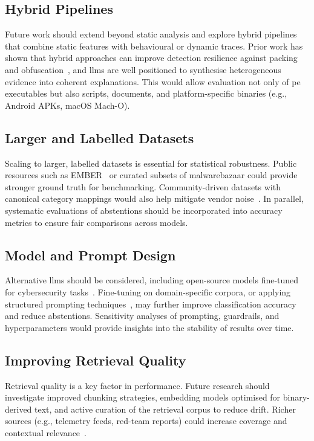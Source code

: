 \subsection{Hybrid Pipelines}\label{sec:HybridPipelines}
Future work should extend beyond static analysis and explore hybrid pipelines that combine static
features with behavioural or dynamic traces. Prior work has shown that hybrid approaches can
improve detection resilience against packing and obfuscation~\cite{fedak2020fundamentals}, and
\glspl{llm} are well positioned to synthesise heterogeneous evidence into coherent explanations.
This would allow evaluation not only of \gls{pe} executables but also scripts, documents, and
platform-specific binaries (e.g., Android APKs, macOS Mach-O).

\subsection{Larger and Labelled Datasets}\label{sec:LargerAndLabelledDatasets}
Scaling to larger, labelled datasets is essential for statistical robustness. Public resources such
as EMBER~\cite{anderson2018ember} or curated subsets of \gls{malwarebazaar} could provide stronger
ground truth for benchmarking. Community-driven datasets with canonical category mappings would
also help mitigate vendor noise~\cite{gaber2024malware}. In parallel, systematic evaluations of
abstentions should be incorporated into accuracy metrics to ensure fair comparisons across models.

\subsection{Model and Prompt Design}\label{sec:ModelAndPromptDesign}
Alternative \glspl{llm} should be considered, including open-source models fine-tuned for
cybersecurity tasks~\cite{metta2024generativeai, nourmohammadzadeh2024llmsurvey}. Fine-tuning on
domain-specific corpora, or applying structured prompting techniques~\cite{sahoo2024systematic},
may further improve classification accuracy and reduce abstentions. Sensitivity analyses of
prompting, guardrails, and hyperparameters would provide insights into the stability of results
over time.

\subsection{Improving Retrieval Quality}\label{sec:ImprovingRetrievalQuality}
Retrieval quality is a key factor in performance. Future research should investigate improved
chunking strategies, embedding models optimised for binary-derived text, and active curation of the
retrieval corpus to reduce drift. Richer sources (e.g., telemetry feeds, red-team reports) could
increase coverage and contextual relevance~\cite{gao2023retrieval, lewis2020retrieval}.

